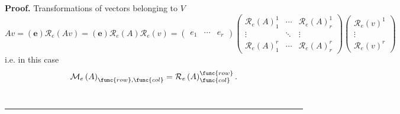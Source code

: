 \documentclass[aps,preprint]{revtex4}
\newenvironment{proof}[1][Proof]{\noindent\textbf{#1.} }{\ \rule{0.5em}{0.5em}}
\begin{document}
\begin{proof}
Transformations of vectors belonging to $V$ 
\begin{equation}
Av=\left( \boldsymbol{e}\right) \mathcal{R}_{e}\left( Av\right) =\left( 
\boldsymbol{e}\right) \mathcal{R}_{e}\left( A\right) \mathcal{R}_{e}\left(
v\right) =\left( 
\begin{array}{ccc}
e_{1} & \cdots & e_{r}%
\end{array}%
\right) \left( 
\begin{array}{ccc}
\mathcal{R}_{e}\left( A\right) _{1}^{1} & \cdots & \mathcal{R}_{e}\left(
A\right) _{r}^{1} \\ 
\vdots & \ddots & \vdots \\ 
\mathcal{R}_{e}\left( A\right) _{1}^{r} & \cdots & \mathcal{R}_{e}\left(
A\right) _{r}^{r}%
\end{array}%
\right) \left( 
\begin{array}{c}
\mathcal{R}_{e}\left( v\right) ^{1} \\ 
\vdots \\ 
\mathcal{R}_{e}\left( v\right) ^{r}%
\end{array}%
\right)
\end{equation}%
i.e. in this case 
\begin{equation}
\mathcal{M}_{e}\left( A\right) _{\func{row},\func{col}}=\mathcal{R}%
_{e}\left( A\right) _{\func{col}}^{\func{row}}.
\end{equation}
\end{proof}
\end{document}
